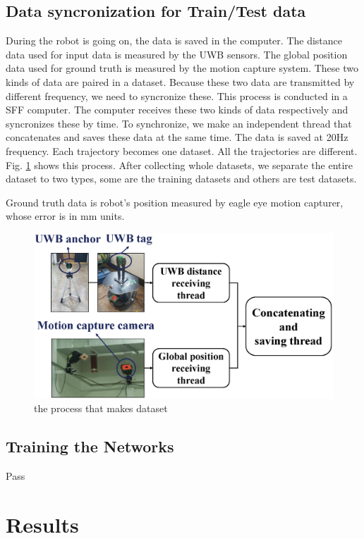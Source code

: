 \documentclass[letterpaper, 10 pt, conference]{ieeeconf}  %
\begin{document}
\subsection{Data syncronization for Train/Test data}
During the robot is going on, the data is saved in the computer. The distance data used for input data is measured by the UWB sensors. The global position data used for ground truth is measured by the motion capture system. These two kinds of data are paired in a dataset. Because these two data are transmitted by different frequency, we need to syncronize these. This process is conducted in a SFF computer. The computer receives these two kinds of data respectively and syncronizes these by time. To synchronize, we make an independent thread that concatenates and saves these data at the same time. The data is saved at 20Hz frequency. Each trajectory becomes one dataset. All the trajectories are different. Fig. \ref{fig:dataset} shows this process. After collecting whole datasets, we separate the entire dataset to two types, some are the training datasets and others are test datasets.

Ground truth data is robot's position measured by eagle eye motion capturer, whose error is in mm units.
\begin{figure}[h!]
	\centering
	\includegraphics[width=0.9\linewidth]{image/data_sync}
	\caption{the process that makes dataset}
	\label{fig:dataset} 	
\end{figure}

\subsection{Training the Networks}

Pass

\section{Results}
\end{document}
